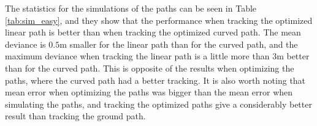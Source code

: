 The statistics for the simulations of the paths can be seen in Table \ref{tab:sim_easy}, and they show that the performance when tracking the optimized linear path is better than when tracking the optimized curved path. The mean deviance is $0.5$m smaller for the linear path than for the curved path, and the maximum deviance when tracking the linear path is a little more than $3$m better than for the curved path. This is opposite of the results when optimizing the paths, where the curved path had a better tracking. It is also worth noting that mean error when optimizing the paths was bigger than the mean error when simulating the paths, and tracking the optimized paths give a considerably better result than tracking the ground path.